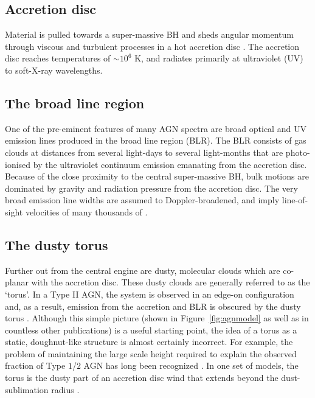 \subsection{Accretion disc}

Material is pulled towards a super-massive BH and sheds angular momentum through viscous and turbulent processes in a hot accretion disc \citep[e.g.][]{begelman85}. 
The accretion disc reaches temperatures of $\sim10^6$ K, and radiates primarily at ultraviolet (UV) to soft-X-ray wavelengths. 

\subsection{The broad line region}

One of the pre-eminent features of many AGN spectra are broad optical and UV emission lines produced in the broad line region (BLR). 
The BLR consists of gas clouds at distances from several light-days to several light-months that are photo-ionised by the ultraviolet continuum emission emanating from the accretion disc.  
Because of the close proximity to the central super-massive BH, bulk motions are dominated by gravity and radiation pressure from the accretion disc.
The very broad emission line widths are assumed to Doppler-broadened, and imply line-of-sight velocities of many thousands of \kms. 

\subsection{The dusty torus}

Further out from the central engine are dusty, molecular clouds which are co-planar with the accretion disc. 
These dusty clouds are generally referred to as the `torus'. 
In a Type II AGN, the system is observed in an edge-on configuration and, as a result, emission from the accretion and BLR is obscured by the dusty torus \citep[e.g.][]{antonucci93}.
Although this simple picture (shown in Figure~\ref{fig:agnmodel} as well as in countless other publications) is a useful starting point, the idea of a torus as a static, doughnut-like structure is almost certainly incorrect. 
For example, the problem of maintaining the large scale height required to explain the observed fraction of Type $1$/$2$ AGN has long been recognized \citep[e.g.][]{krolik88}. 
In one set of models, the torus is the dusty part of an accretion disc wind that extends beyond the dust-sublimation radius \citep[e.g.][]{konigl94,everett09,gallagher12,everett05,keating12,elitzur06}. 

